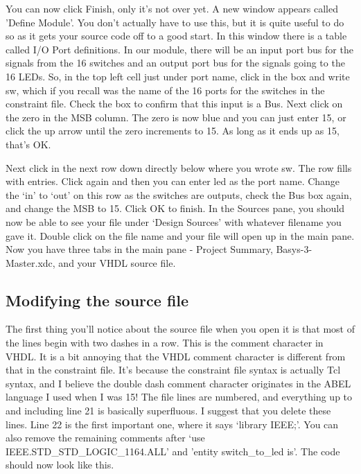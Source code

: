 \documentclass[../physical_computing.tex]{subfiles}
\begin{document}
You can now click Finish, only it's not over yet. A new window appears called 'Define Module'. You don't actually have to use this, but it is quite useful to do so as it gets your source code off to a good start. In this window there is a table called I/O Port definitions. In our module, there will be an input port bus for the signals from the 16 switches and an output port bus for the signals going to the 16 LEDs. So, in the top left cell just under port name, click in the box and write sw, which if you recall was the name of the 16 ports for the switches in the constraint file. Check the box to confirm that this input is a Bus. Next click on the zero in the MSB column. The zero is now blue and you can just enter 15, or click the up arrow until the zero increments to 15. As long as it ends up as 15, that's OK. 

Next click in the next row down directly below where you wrote sw. The row fills with entries. Click again and then you can enter led as the port name. Change the `in' to `out' on this row as the switches are outputs, check the Bus box again, and change the MSB to 15. Click OK to finish. In the Sources pane, you should now be able to see your file under `Design Sources' with whatever filename you gave it. Double click on the file name and your file will open up in the main pane. Now you have three tabs in the main pane - Project Summary, Basys-3-Master.xdc, and your VHDL source file.

\subsection{Modifying the source file}
\label{sec:source_file_mods}

The first thing you'll notice about the source file when you open it is that most of the lines begin with two dashes in a row. This is the comment character in VHDL. It is a bit annoying that the VHDL comment character is different from that in the constraint file. It's because the constraint file syntax is actually Tcl syntax, and I believe the double dash comment character originates in the ABEL language I used when I was 15! The file lines are numbered, and everything up to and including line 21 is basically superfluous. I suggest that you delete these lines. Line 22 is the first important one, where it says `library IEEE;'. You can also remove the remaining comments after `use IEEE.STD\_STD\_LOGIC\_1164.ALL' and 'entity switch\_to\_led is'. The code should now look like this.

\newpage
\end{document}
